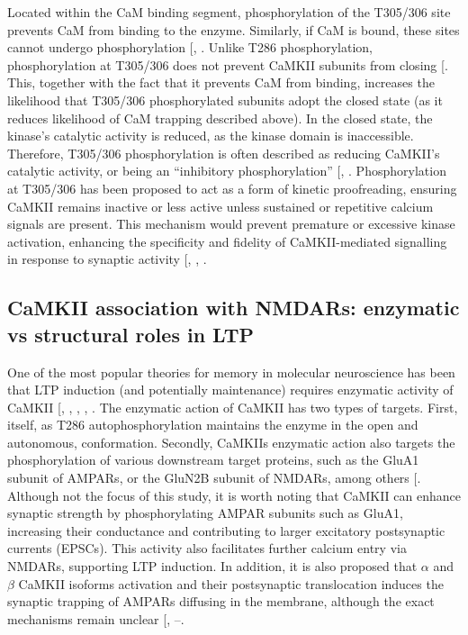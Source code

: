 \documentclass[
  11pt,
  letterpaper,
]{scrreprt}
\begin{document}
Located within the CaM binding segment, phosphorylation of the T305/306
site prevents CaM from binding to the enzyme. Similarly, if CaM is
bound, these sites cannot undergo phosphorylation
{[},
\citeproc{ref-colbran1993Inactivation}{197}{]}. Unlike T286
phosphorylation, phosphorylation at T305/306 does not prevent CaMKII
subunits from closing {[}\citeproc{ref-cook2021CaMKIIb}{198}{]}. This,
together with the fact that it prevents CaM from binding, increases the
likelihood that T305/306 phosphorylated subunits adopt the closed state
(as it reduces likelihood of CaM trapping described above). In the
closed state, the kinase's catalytic activity is reduced, as the kinase
domain is inaccessible. Therefore, T305/306 phosphorylation is often
described as reducing CaMKII's catalytic activity, or being an
``inhibitory phosphorylation''
{[},
\citeproc{ref-yasuda2022CaMKII}{200}{]}. Phosphorylation at T305/306 has
been proposed to act as a form of kinetic proofreading, ensuring CaMKII
remains inactive or less active unless sustained or repetitive calcium
signals are present. This mechanism would prevent premature or excessive
kinase activation, enhancing the specificity and fidelity of
CaMKII-mediated signalling in response to synaptic activity
{[},
,
\citeproc{ref-ordyan2020Interactionsb}{201}{]}.

\subsection{CaMKII association with NMDARs: enzymatic vs structural
roles in LTP}\label{sec-CaMKII-NMDAR-association}

One of the most popular theories for memory in molecular neuroscience
has been that LTP induction (and potentially maintenance) requires
enzymatic activity of CaMKII
{[},
,
,
,
\citeproc{ref-coultrap2014Autonomous}{202}{]}. The enzymatic action of
CaMKII has two types of targets. First, itself, as T286
autophosphorylation maintains the enzyme in the open and autonomous,
conformation. Secondly, CaMKIIs enzymatic action also targets the
phosphorylation of various downstream target proteins, such as the GluA1
subunit of AMPARs, or the GluN2B subunit of NMDARs, among others
{[}\citeproc{ref-nicoll2023Synaptic}{203}{]}. Although not the focus of
this study, it is worth noting that CaMKII can enhance synaptic strength
by phosphorylating AMPAR subunits such as GluA1, increasing their
conductance and contributing to larger excitatory postsynaptic currents
(EPSCs). This activity also facilitates further calcium entry via
NMDARs, supporting LTP induction. In addition, it is also proposed that
\(\alpha\) and \(\beta\) CaMKII isoforms activation and their
postsynaptic translocation induces the synaptic trapping of AMPARs
diffusing in the membrane, although the exact mechanisms remain unclear
{[},
--\citeproc{ref-patriarchi2018Postsynaptic}{206}{]}.
\end{document}
